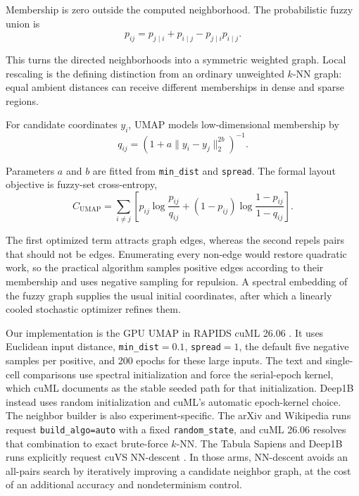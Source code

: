 \documentclass[10pt]{article}
\begin{document}
Membership is zero outside the computed neighborhood.  The probabilistic fuzzy union is
\begin{equation}
 p_{ij}=p_{j\mid i}+p_{i\mid j}-p_{j\mid i}p_{i\mid j}.
 \label{eq:umap-union}
\end{equation}

This turns the directed neighborhoods into a symmetric weighted graph.  Local rescaling
is the defining distinction from an ordinary unweighted $k$-NN graph: equal ambient
distances can receive different memberships in dense and sparse regions.

For candidate coordinates $y_i$, UMAP models low-dimensional membership by
\begin{equation}
 q_{ij}=\left(1+a\|y_i-y_j\|_2^{2b}\right)^{-1}.
 \label{eq:umap-low-membership}
\end{equation}

Parameters $a$ and $b$ are fitted from \texttt{min\_dist} and \texttt{spread}.  The
formal layout objective is fuzzy-set cross-entropy,
\begin{equation}
 C_{\mathrm{UMAP}}
 =\sum_{i\ne j}
 \left[
 p_{ij}\log\frac{p_{ij}}{q_{ij}}
 +(1-p_{ij})\log\frac{1-p_{ij}}{1-q_{ij}}
 \right].
 \label{eq:umap-cross-entropy}
\end{equation}

The first optimized term attracts graph edges, whereas the second repels pairs that should not
be edges.  Enumerating every non-edge would restore quadratic work, so the practical
algorithm samples positive edges according to their membership and uses negative
sampling for repulsion.  A spectral embedding of the fuzzy graph supplies the usual
initial coordinates, after which a linearly cooled stochastic optimizer refines them.

Our implementation is the GPU UMAP in RAPIDS cuML 26.06
\cite{cuml2606}.  It uses Euclidean input distance, \texttt{min\_dist}$=0.1$,
\texttt{spread}$=1$, the default five negative samples per positive, and 200 epochs for
these large inputs.  The text and single-cell comparisons use spectral initialization
and force the serial-epoch kernel, which cuML documents as the stable seeded path for
that initialization.  Deep1B instead uses random initialization and cuML's automatic
epoch-kernel choice.  The neighbor builder is also experiment-specific.  The arXiv and
Wikipedia runs request
\texttt{build\_algo=auto} with a fixed \texttt{random\_state}, and cuML 26.06 resolves that
combination to exact brute-force $k$-NN.  The Tabula Sapiens and Deep1B runs explicitly
request cuVS NN-descent \cite{nndescent,cuvs2606}.  In those arms, NN-descent avoids an
all-pairs search by iteratively improving a candidate neighbor graph, at the cost of an
additional accuracy and nondeterminism control.
\end{document}
